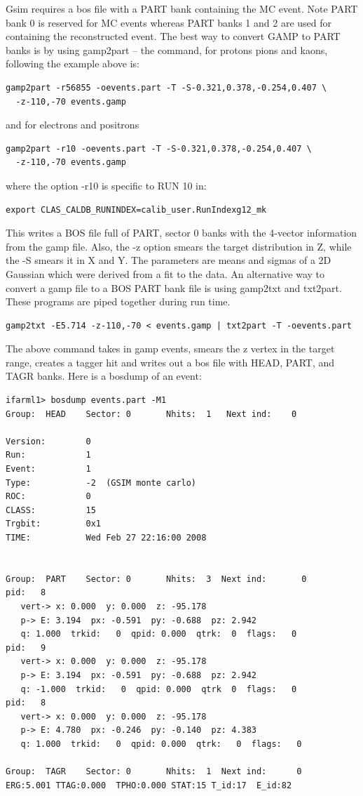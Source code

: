 Gsim requires a bos file with a PART bank containing the MC event. Note PART bank 0 is reserved for MC events whereas PART banks 1 and 2 are used for containing the reconstructed event. The best way to convert GAMP to PART banks is by using gamp2part -- the command, for protons pions and kaons, following the example above is:
\begin{verbatim}
gamp2part -r56855 -oevents.part -T -S-0.321,0.378,-0.254,0.407 \
  -z-110,-70 events.gamp
\end{verbatim}
and for electrons and positrons
\begin{verbatim}
gamp2part -r10 -oevents.part -T -S-0.321,0.378,-0.254,0.407 \
  -z-110,-70 events.gamp
\end{verbatim}
where the option -r10 is specific to RUN 10 in:
\begin{verbatim}
export CLAS_CALDB_RUNINDEX=calib_user.RunIndexg12_mk
\end{verbatim}
This writes a BOS file full of PART, sector 0 banks with the 4-vector information from the gamp file. Also, the -z option smears the target distribution in Z, while the -S smears it in X and Y. The parameters are means and sigmas of a 2D Gaussian which were derived from a fit to the data. An alternative way to convert a gamp file to a BOS PART bank file is using gamp2txt and txt2part. These programs are piped together during run time.
\begin{verbatim}
gamp2txt -E5.714 -z-110,-70 < events.gamp | txt2part -T -oevents.part
\end{verbatim}
The above command takes in gamp events, smears the z vertex in the target range, creates a tagger hit and writes out a bos file with HEAD, PART, and TAGR banks. Here is a bosdump of an event:
\begin{verbatim}
ifarml1> bosdump events.part -M1
Group:  HEAD    Sector: 0       Nhits:  1   Next ind:    0

Version:        0
Run:            1
Event:          1
Type:           -2  (GSIM monte carlo)
ROC:            0
CLASS:          15
Trgbit:         0x1
TIME:           Wed Feb 27 22:16:00 2008


Group:  PART    Sector: 0       Nhits:  3  Next ind:       0
pid:   8
   vert-> x: 0.000  y: 0.000  z: -95.178
   p-> E: 3.194  px: -0.591  py: -0.688  pz: 2.942
   q: 1.000  trkid:   0  qpid: 0.000  qtrk:  0  flags:   0
pid:   9
   vert-> x: 0.000  y: 0.000  z: -95.178
   p-> E: 3.194  px: -0.591  py: -0.688  pz: 2.942
   q: -1.000  trkid:   0  qpid: 0.000  qtrk  0  flags:   0
pid:   8
   vert-> x: 0.000  y: 0.000  z: -95.178
   p-> E: 4.780  px: -0.246  py: -0.140  pz: 4.383
   q: 1.000  trkid:   0  qpid: 0.000  qtrk:   0  flags:   0

Group:  TAGR    Sector: 0       Nhits:  1  Next ind:      0
ERG:5.001 TTAG:0.000  TPHO:0.000 STAT:15 T_id:17  E_id:82
\end{verbatim}

